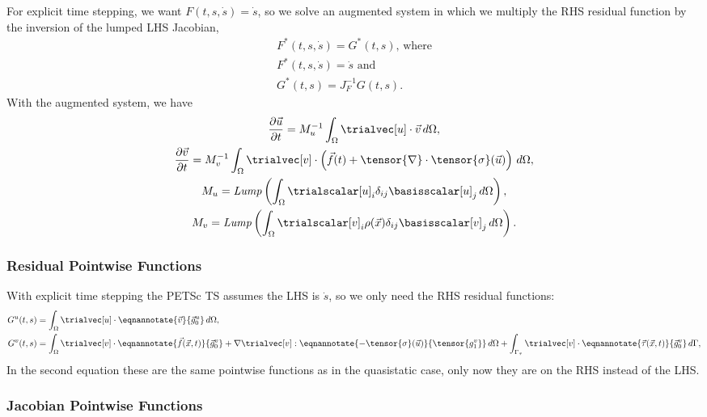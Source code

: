 For explicit time stepping, we want $F(t,s,\dot{s})=\dot{s}$, so we
solve an augmented system in which we multiply the RHS residual
function by the inversion of the lumped LHS Jacobian,
\begin{gather}
  F^*(t,s,\dot{s}) = G^*(t,s) \text{, where} \\
  F^*(t,s,\dot{s}) = \dot{s} \text{ and} \\
  G^*(t,s) = J_F^{-1} G(t,s).
\end{gather}
With the augmented system, we have
\begin{gather}
  \frac{\partial \vec{u}}{\partial t}  = M_u^{-1} \int_\Omega \trialvec[u] \cdot \vec{v} \, d\Omega, \\
  \frac{\partial \vec{v}}{\partial t} = M_v^{-1} \int_\Omega \trialvec[v] \cdot \left( \vec{f}(t) + \tensor{\nabla} \cdot \tensor{\sigma} (\vec{u}) \right) \, d\Omega, \\
  M_u = \mathit{Lump}\left( \int_\Omega \trialscalar[u]_i \delta_{ij} \basisscalar[u]_j \, d\Omega \right), \\
  M_v = \mathit{Lump}\left( \int_\Omega \trialscalar[v]_i \rho(\vec{x}) \delta_{ij} \basisscalar[v]_j \, d\Omega \right).
\end{gather}

\subsubsection{Residual Pointwise Functions}

With explicit time stepping the PETSc TS assumes the LHS is
$\dot{s}$, so we only need the RHS residual functions:
\begin{align}
  G^u(t,s) &= \int_\Omega \trialvec[u] \cdot \eqnannotate{\vec{v}}{\vec{g}^u_0} \, d\Omega, \\
  G^v(t,s) &=  \int_\Omega \trialvec[v] \cdot \eqnannotate{\vec{f}(\vec{x},t)}{\vec{g}^v_0} + \nabla \trialvec[v] : \eqnannotate{-\tensor{\sigma}(\vec{u})}{\tensor{g^v_1}} \, d\Omega
  + \int_{\Gamma_\tau} \trialvec[v] \cdot \eqnannotate{\vec{\tau}(\vec{x},t)}{\vec{g}^v_0} \, d\Gamma,
\end{align}
In the second equation these are the same pointwise functions as in the
quasistatic case, only now they are on the RHS instead of the LHS.


\subsubsection{Jacobian Pointwise Functions}

